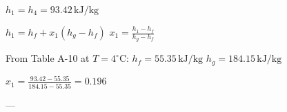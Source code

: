 \( h_1 = h_4 = 93.42 \, \text{kJ/kg} \)  

\( h_1 = h_f + x_1 (h_g - h_f) \)  
\( x_1 = \frac{h_1 - h_f}{h_g - h_f} \)  

From Table A-10 at \( T = 4^\circ \text{C} \):  
\( h_f = 55.35 \, \text{kJ/kg} \)  
\( h_g = 184.15 \, \text{kJ/kg} \)  

\( x_1 = \frac{93.42 - 55.35}{184.15 - 55.35} = 0.196 \)  

---